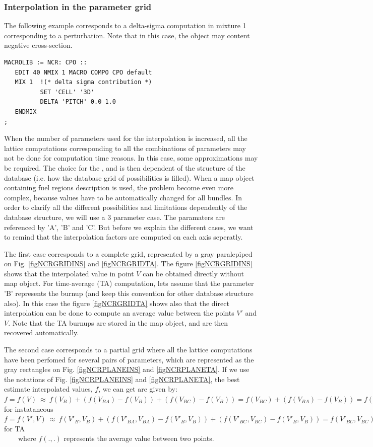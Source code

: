\subsubsection{Interpolation in the parameter grid}


The following example corresponds to a delta-sigma computation in mixture 1 corresponding to a perturbation. Note that in this case, the  object  may content negative cross-section. 
\begin{verbatim}
MACROLIB := NCR: CPO ::
   EDIT 40 NMIX 1 MACRO COMPO CPO default
   MIX 1  !(* delta sigma contribution *)
          SET 'CELL' '3D'
          DELTA 'PITCH' 0.0 1.0
   ENDMIX
;
\end{verbatim}

When the number of parameters used for the interpolation is increased, all the lattice computations corresponding to all the combinations of parameters may not be done for computation time reasons. In this case, some approximations may be required. The choice for the ,  and  is then dependent of the structure of the database (i.e. how the database grid of possibilities is filled). When a {\sc map} object containing fuel regions description is used, the problem become even more complex, because values have to be automatically changed for all bundles. In order to clarify all the different possibilities and limitations dependently of the database structure, we will use a 3 parameter case. The paramaters are referenced by 'A', 'B' and 'C'. But before we explain the different cases, we want to remind that the interpolation factors are computed on each axis seperatly.

The first case corresponds to a complete grid, represented by a gray paralepiped on Fig. \ref{figNCRGRIDINS} and \ref{figNCRGRIDTA}. The
figure \ref{figNCRGRIDINS} shows that the interpolated value in point $V$ can be obtained directly without {\sc map} object. For time-average (TA) computation, lets assume that the parameter 'B' represents the burnup (and keep this convention for other database structure also). In this case the figure \ref{figNCRGRIDTA} shows also that the direct interpolation can be done to compute an average value between the points $V'$ and $V$. Note that the TA burnups are stored in the {\sc map} object, and are then recovered automatically.

The second case corresponds to a partial grid where all the lattice computations have been perfomed for several pairs of parameters, which are represented as the gray rectangles on Fig. \ref{figNCRPLANEINS} and \ref{figNCRPLANETA}. If we use the notations of Fig. \ref{figNCRPLANEINS} and \ref{figNCRPLANETA}, the best estimate interpolated values, $f$, we can get are given by: \\
$f=f(V)~\approx~f(V_B)+(f(V_{BA})-f(V_B))+(f(V_{BC})-f(V_B))=f(V_{BC})+(f(V_{BA})-f(V_B))=f(V_{BA})+(f(V_{BC})-f(V_B))$ for instataneous\\
$f=f(V',V)~\approx~f(V'_B,V_B)+(f(V'_{BA},V_{BA})-f(V'_B,V_B))+(f(V'_{BC},V_{BC})-f(V'_B,V_B))=f(V'_{BC},V_{BC})+(f(V'_{BA},V_{BA})-f(V'_B,V_B))=f(V'_{BA},V_{BA})+(f(V'_{BC},V_{BC})-f(V'_B,V_B))$ for TA\\
~~~~where $f(.,.)$ represents the average value between two points.

